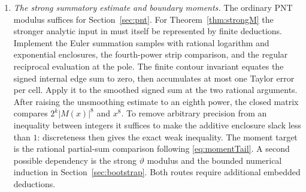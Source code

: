 \begin{enumerate}
For a tail use an additional free end index $V\ge U$, and prove the
displayed estimate for every such $V$ by induction on $V-U$. Pass
between different cutoffs by the triangle inequality and the given
moduli. At the PNT step instantiate \texttt{psi\_modulus} with the
repository's own mesh and denominator; compare alternative rational
meshes by refining to their product. These operations leave all
induction formulas quantifier-free after the bounded checks are compiled.
A statement about a family of names quantifies over indices and precisions
for that fixed family.
\item \emph{The strong summatory estimate and boundary moments.}
The ordinary PNT modulus suffices for Section~\ref{sec:pnt}.
For Theorem~\ref{thm:strongM} the stronger analytic input in \cite{strip}
must itself be represented by finite deductions. Implement the Euler
summation samples with rational logarithm and exponential enclosures,
the fourth-power strip comparison, and the regular reciprocal evaluation
at the pole. The finite contour invariant equates the signed internal
edge sum to zero, then accumulates at most one Taylor error per cell.
Apply it to the smoothed signed sum at the two rational arguments.
After raising the unsmoothing estimate to an eighth power, the closed
matrix compares $2^k|M(x)|^8$ and $x^8$. To remove arbitrary precision
from an inequality between integers it suffices to make the additive
enclosure slack less than $1$: discreteness then gives the exact weak
inequality. The moment target is the rational partial-sum comparison
following \eqref{eq:momentTail}. A second possible dependency is the
strong $\vartheta$ modulus and the bounded numerical induction in
Section~\ref{sec:bootstrap}. Both routes require additional embedded
deductions.
\end{enumerate}
